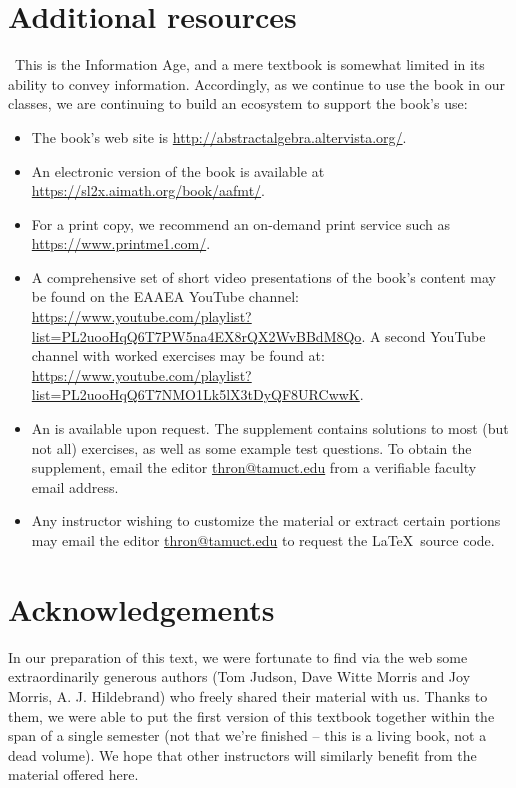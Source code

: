 \section*{Additional resources}\label{sec:additionalResources}
\
This is the Information Age, and a mere textbook is somewhat limited in its ability to convey information.  Accordingly, as we continue to use the book in our classes, we are continuing to build an ecosystem  to support the book's use:
\begin{itemize}
\item
The book's web site is \url{http://abstractalgebra.altervista.org/}.
\item
An electronic version of the book is available at \url{https://sl2x.aimath.org/book/aafmt/}.
\item
For a print copy, we recommend an on-demand print service such as \url{https://www.printme1.com/}.
\item
 A comprehensive set of short video presentations of the book's content may be found on the EAAEA YouTube channel: \url{https://www.youtube.com/playlist?list=PL2uooHqQ6T7PW5na4EX8rQX2WvBBdM8Qo}. A second YouTube channel with worked exercises may be found at: \url{https://www.youtube.com/playlist?list=PL2uooHqQ6T7NMO1Lk5lX3tDyQF8URCwwK}. 
\item
An   is available upon request. The supplement contains solutions to most (but not all) exercises, as well as some example test questions.  To obtain the supplement,  email the editor \href{mailto:thron@tamuct.edu}{thron@tamuct.edu} from a verifiable faculty email address.
\item
Any instructor wishing to customize the material or extract certain portions may email the editor \href{mailto:thron@tamuct.edu}{thron@tamuct.edu}  to request the \LaTeX~source code. 
\end{itemize}


\medskip

\noindent
\section*{Acknowledgements}\label{sec:ack}

In our preparation of this text, we were fortunate to find via the web  some extraordinarily generous authors (Tom Judson, Dave Witte Morris and Joy Morris, A. J. Hildebrand) who freely shared their material with us. Thanks to them, we were able to put the first version of this  textbook together within the span of a single semester (not that we're finished -- this is a living book, not a dead volume). We hope that other instructors will similarly benefit from the material offered here.  

